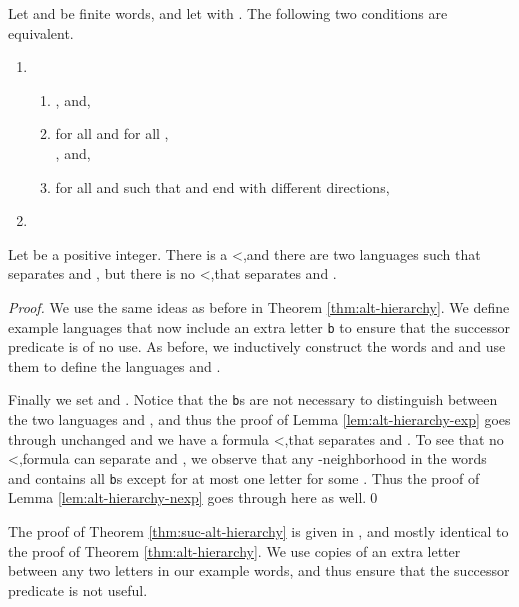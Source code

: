 \documentclass{LMCS}
\newcommand{\qedconf}{}
\renewcommand{\qedconf}{\qed}
\begin{document}
\begin{thm}
  \label{thm:suc-alt-structure} 
  Let  and  be finite words, and let  with . The
  following two conditions are equivalent.
  \begin{enumerate}[\em(i)]
  \item
    \begin{enumerate}[\em(a)]
    \item , and,
    \item for all  and for all ,\\
      , and,
    \item for all  and  such that  and  end with
      different directions, 
    \end{enumerate}
  \item 
  \end{enumerate}
\end{thm}

\begin{thm}
  \label{thm:suc-alt-hierarchy}
  Let  be a positive integer. There is a
  <,\suc and there are two languages  such that  separates  and ,
  but there is no <,\suc that separates  and
  .
\end{thm}


\begin{full}
\begin{proof}
  We use the same ideas as before in Theorem \ref{thm:alt-hierarchy}. We
  define example languages that now include an extra letter \texttt{b} to ensure
  that the successor predicate is of no use. As before, we inductively
  construct the words  and  and use them to define the
  languages  and .

   Finally we set  and . Notice that the \texttt{b}s are not necessary to
    distinguish between the two languages  and , and thus
    the proof of Lemma \ref{lem:alt-hierarchy-exp} goes through
    unchanged and we have a formula <,\suc that separates  and . To see that
    no <,\suc formula can separate  and ,
    we observe that any -neighborhood in the words 
    and  contains all \texttt{b}s except for at most one
    letter  for some . Thus the proof of
    Lemma \ref{lem:alt-hierarchy-nexp} goes through here as
    well.\qedconf
\end{proof}
\end{full}

\begin{conference}
  The proof of Theorem \ref{thm:suc-alt-hierarchy} is given in \cite{WI07},
  and mostly identical to the proof of Theorem \ref{thm:alt-hierarchy}. We use
   copies of an extra letter between any two letters in our example words,
  and thus ensure that the successor predicate is not useful.
\end{conference}
\end{document}
